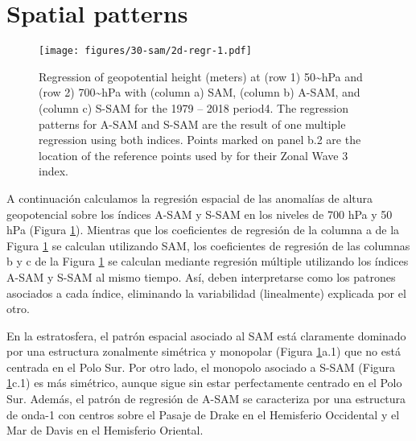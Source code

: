 \documentclass[12pt,oneside]{reedthesis}
\begin{document}
\hypertarget{spatial}{%
\section{Spatial patterns}\label{spatial}}
\begin{figure}
\centering
\texttt{[image: figures/30-sam/2d-regr-1.pdf]}
\caption{\label{fig:2d-regr}Regression of geopotential height (meters) at (row 1) 50\textasciitilde hPa and (row 2) 700\textasciitilde hPa with (column a) SAM, (column b) A-SAM, and (column c) S-SAM for the 1979 -- 2018 period4. The regression patterns for A-SAM and S-SAM are the result of one multiple regression using both indices. Points marked on panel b.2 are the location of the reference points used by \cite{raphael2004} for their Zonal Wave 3 index.}
\end{figure}
A continuación calculamos la regresión espacial de las anomalías de altura geopotencial sobre los índices A\nobreakdash-SAM y S\nobreakdash-SAM en los niveles de 700 hPa y 50 hPa (Figura \ref{fig:2d-regr}).
Mientras que los coeficientes de regresión de la columna a de la Figura \ref{fig:2d-regr} se calculan utilizando SAM, los coeficientes de regresión de las columnas b y c de la Figura \ref{fig:2d-regr} se calculan mediante regresión múltiple utilizando los índices A\nobreakdash-SAM y S\nobreakdash-SAM al mismo tiempo.
Así, deben interpretarse como los patrones asociados a cada índice, eliminando la variabilidad (linealmente) explicada por el otro.

En la estratosfera, el patrón espacial asociado al SAM está claramente dominado por una estructura zonalmente simétrica y monopolar (Figura \ref{fig:2d-regr}a.1) que no está centrada en el Polo Sur.
Por otro lado, el monopolo asociado a S\nobreakdash-SAM (Figura \ref{fig:2d-regr}c.1) es más simétrico, aunque sigue sin estar perfectamente centrado en el Polo Sur.
Además, el patrón de regresión de A\nobreakdash-SAM se caracteriza por una estructura de onda-1 con centros sobre el Pasaje de Drake en el Hemisferio Occidental y el Mar de Davis en el Hemisferio Oriental.
\end{document}
